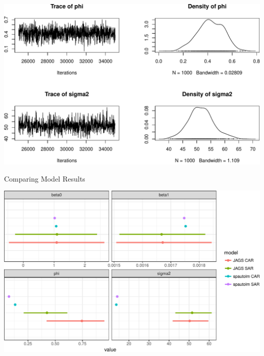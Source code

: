 \documentclass[11pt,ignorenonframetext,]{beamer}
\begin{document}
\begin{frame}{}

\includegraphics{Lec19_files/figure-beamer/unnamed-chunk-23-1.pdf}

\end{frame}

\begin{frame}{Comparing Model Results}

\includegraphics{Lec19_files/figure-beamer/unnamed-chunk-24-1.pdf}

\end{frame}
\end{document}
